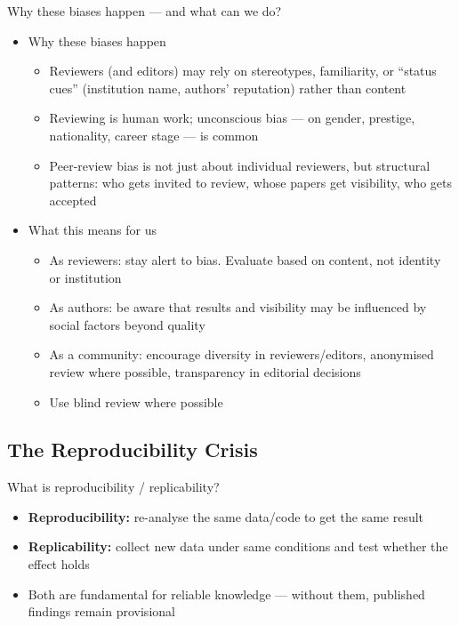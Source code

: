 \documentclass[aspectratio=169]{beamer}
\begin{document}
\begin{frame}{Why these biases happen — and what can we do?}
  \begin{itemize}
  \item Why these biases happen
    \begin{itemize}
    \item Reviewers (and editors) may rely on stereotypes, familiarity, or ``status cues'' (institution name, authors' reputation) rather than content
    \item Reviewing is human work; unconscious bias — on gender, prestige, nationality, career stage — is common
    \item Peer-review bias is not just about individual reviewers, but structural patterns: who gets invited to review, whose papers get visibility, who gets accepted
    \end{itemize}
  \item What this means for us
    \begin{itemize}
    \item As reviewers: stay alert to bias. Evaluate based on content, not identity or institution
    \item As authors: be aware that results and visibility may be influenced by social factors beyond quality
    \item As a community: encourage diversity in reviewers/editors, anonymised review where possible, transparency in editorial decisions
    \item Use blind review where possible
    \end{itemize}
  \end{itemize}
\end{frame}


\subsection{The Reproducibility Crisis} 
\begin{frame}{What is reproducibility / replicability?}
\begin{itemize}
  \item \textbf{Reproducibility:} re-analyse the same data/code to get the same result
  \item \textbf{Replicability:} collect new data under same conditions and test whether the effect holds
  \item Both are fundamental for reliable knowledge — without them, published findings remain provisional \citep{goodman2016reproducibility}
\end{itemize}
\end{frame}
\end{document}
